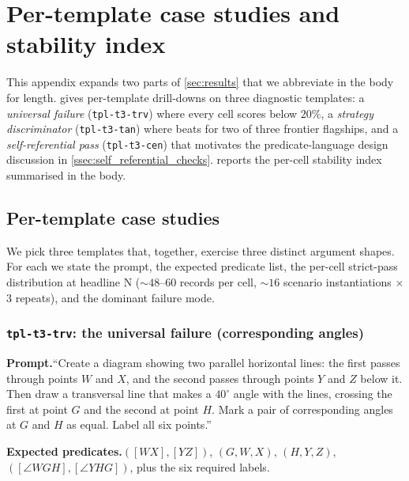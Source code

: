 \section{Per-template case studies and stability index}
\label{app:case_studies}

This appendix expands two parts of \cref{sec:results} that we abbreviate in the body for length.
 gives per-template drill-downs on three diagnostic templates: a \emph{universal failure} (\texttt{tpl-t3-trv}) where every cell scores below $20\%$, a \emph{strategy discriminator} (\texttt{tpl-t3-tan}) where \rawcode beats \structured for two of three frontier flagships, and a \emph{self-referential pass} (\texttt{tpl-t3-cen}) that motivates the predicate-language design discussion in \cref{ssec:self_referential_checks}.
 reports the per-cell stability index summarised in the body.

\subsection{Per-template case studies}
\label{app:case_studies:templates}

We pick three templates that, together, exercise three distinct argument shapes.
For each we state the prompt, the expected predicate list, the per-cell strict-pass distribution at headline N ($\sim 48$--$60$ records per cell, $\sim 16$ scenario instantiations $\times$ $3$ repeats), and the dominant failure mode.

\subsubsection{\texttt{tpl-t3-trv}: the universal failure (corresponding angles)}
\label{sssec:trv_case}

\noindent\textbf{Prompt.}\quad ``Create a diagram showing two parallel horizontal lines: the first passes through points $W$ and $X$, and the second passes through points $Y$ and $Z$ below it. Then draw a transversal line that makes a $40^\circ$ angle with the lines, crossing the first at point $G$ and the second at point $H$. Mark a pair of corresponding angles at $G$ and $H$ as equal. Label all six points.''

\noindent\textbf{Expected predicates.}\quad {}$([WX], [YZ])$, $(G, W, X)$, $(H, Y, Z)$, $([\angle WGH], [\angle YHG])$, plus the six required labels.

